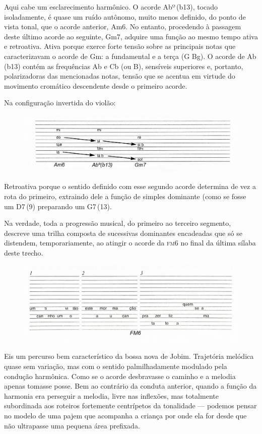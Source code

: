 Aqui cabe um esclarecimento harmônico. O acorde Abº\,(b13), tocado
isoladamente, é quase um ruído autônomo, muito menos definido, do ponto
de vista tonal, que o acorde anterior, Am6. No entanto, procedendo à
passagem deste último acorde ao seguinte, Gm7, adquire uma função ao
mesmo tempo ativa e retroativa. Ativa porque exerce forte tensão sobre
as principais notas que caracterizavam o acorde de Gm: a fundamental e
a terça (G Bg). O acorde de Ab\,(b13) contém as frequências Ab e
Cb (ou B), sensíveis superiores e, portanto, polarizadoras das
mencionadas notas, tensão que se acentua em virtude do movimento
cromático descendente desde o primeiro acorde. 

Na configuração invertida do violão:

\begin{figure}[H]
\includegraphics[width=\textwidth]{./imgs/figura7.jpg}
\end{figure}

Retroativa porque o sentido definido com esse segundo acorde determina
de vez a rota do primeiro, extraindo dele a função de simples dominante
(como se fosse um D7\,(9) preparando um G7\,(13).

Na verdade, toda a progressão musical, do primeiro ao terceiro segmento,
descreve uma trilha composta de sucessivas dominantes encadeadas que só
se distendem, temporariamente, ao atingir o acorde da \textsc{fm6} no final da
última sílaba deste trecho.

\begin{figure}[H]
\includegraphics[width=\textwidth]{./imgs/figura8.jpg}
\end{figure}

Eis um percurso bem característico da bossa nova de Jobim. Trajetória
melódica quase sem variação, mas com o sentido palmilhadamente modulado
pela condução harmônica. Como se o acorde desbravasse o caminho e a
melodia apenas tomasse posse. Bem ao contrário da conduta anterior,
quando a função da harmonia era perseguir a melodia, livre nas
inflexões, mas totalmente subordinada aos roteiros fortemente
centrípetos da tonalidade --- podemos pensar no modelo de uma pajem que
acompanha a criança por onde ela for desde que não ultrapasse uma
pequena área prefixada.

